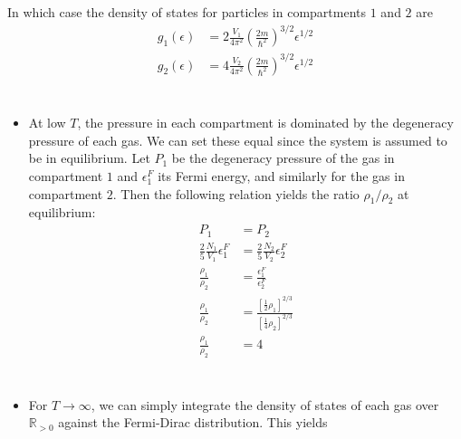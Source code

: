 \documentclass[]{article}
\begin{document}
\begin{enumerate}[1.]
In which case the density of states for particles in compartments $1$ and $2$ are \\

\begin{equation}
\begin{aligned}
g_1( \epsilon ) & = 2 \frac{ V_1 }{ 4\pi^2 } \left(  \frac{ 2m }{ \hbar^2 } \right)^{3/2} \epsilon^{1/2} \\
%
g_2( \epsilon ) & = 4 \frac{ V_2 }{ 4\pi^2 } \left(  \frac{ 2m }{ \hbar^2 } \right)^{3/2} \epsilon^{1/2} \\
%
\end{aligned}
\end{equation} \\



\begin{itemize}

\item At low $T$, the pressure in each compartment is dominated by the degeneracy pressure of each gas. We can set these equal since the system is assumed to be in equilibrium. Let $P_1$ be the degeneracy pressure of the gas in compartment $1$ and $\epsilon_1^F$ its Fermi energy, and similarly for the gas in compartment $2$. Then the following relation yields the ratio $\rho_1/\rho_2$ at equilibrium: \\


\begin{equation}
\begin{aligned}
P_1 & = P_2 \\
%
\frac{ 2 }{ 5 } \frac{ N_1 }{ V_1 } \epsilon_1^F & = \frac{ 2 }{ 5 } \frac{ N_2 }{ V_2 } \epsilon_2^F \\
%
\frac{  \rho_1 }{ \rho_2 } & = \frac{  \epsilon_1^F }{ \epsilon_2^F } \\
%
\frac{  \rho_1 }{ \rho_2 } & = \frac{  \left[  \frac{ 1 }{ 2 } \rho_1  \right]^{2/3}   }{  \left[  \frac{ 1 }{ 4 } \rho_2  \right]^{2/3}   } \\
%
\frac{  \rho_1 }{ \rho_2 }  & = 4 \\
%
\end{aligned}
\end{equation} \\



\item For $T \to \infty$, we can simply integrate the density of states of each gas over $\mathbb{R}_{>0}$ against the Fermi-Dirac distribution. This yields \\




\end{itemize}
\end{enumerate}
\end{document}
